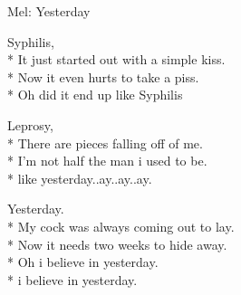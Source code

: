 \begin{SongText}[Syphilis]
    \begin{SongInfo}
        Mel: Yesterday
    \end{SongInfo}
    \begin{SongVerse}
        Syphilis,\\*%
        It just started out with a simple kiss.\\*%
        Now it even hurts to take a piss.\\*%
        Oh did it end up like Syphilis
    \end{SongVerse}
    \begin{SongVerse}
        Leprosy,\\*%
        There are pieces falling off of me.\\*%
        I'm not half the man i used to be.\\*%
        like yesterday..ay..ay..ay.
    \end{SongVerse}
    \begin{SongVerse}
        Yesterday.\\*%
        My cock was always coming out to lay.\\*%
        Now it needs two weeks to hide away.\\*%
        Oh i believe in yesterday.\\*%
        i believe in yesterday.
    \end{SongVerse}
\end{SongText}
